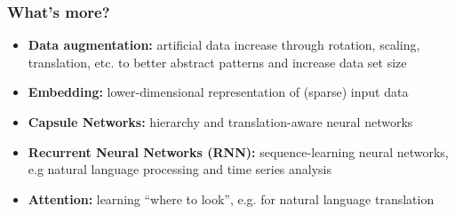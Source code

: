 \documentclass[aspectratio=1610]{beamer}
\begin{document}
\begin{frame}
\frametitle{What's more?}

\begin{itemize}
    \item \textbf{Data augmentation:} artificial data increase through rotation, scaling,\\ translation, etc. to better abstract patterns and increase data set size
    \item \textbf{Embedding:} lower-dimensional representation of (sparse) input data
    \item \textbf{Capsule Networks:} hierarchy and translation-aware neural networks
    \item \textbf{Recurrent Neural Networks (RNN):} sequence-learning neural networks,\\ e.g natural language processing and time series analysis
    \item \textbf{Attention:} learning ``where to look'', e.g. for natural language translation
\end{itemize}
\end{frame}
\end{document}
